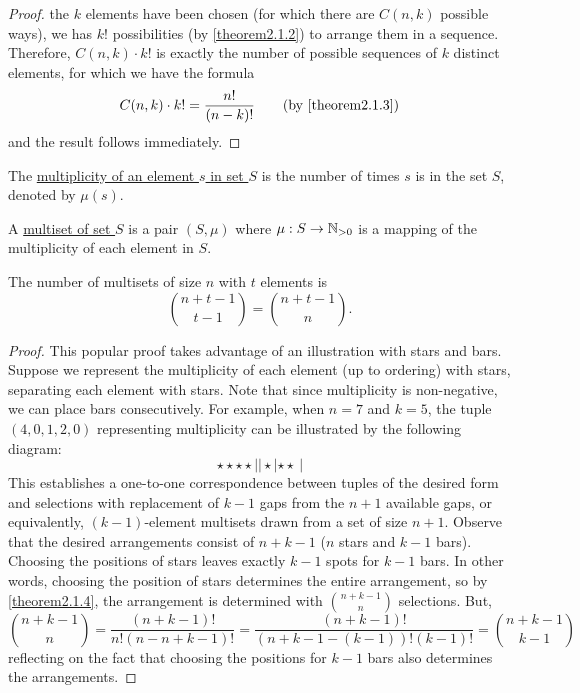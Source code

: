 \documentclass[11pt]{article}
\begin{document}
\begin{titlepage}
\begin{proof}
	the $k$ elements have been chosen (for which there are $C(n,k)$ possible
	ways), we has $k!$ possibilities (by \cref{theorem2.1.2}) to arrange them in
	a sequence. Therefore, $C(n,k) \cdot k!$ is exactly the number of possible
	sequences of $k$ distinct elements, for which we have the formula
	\begin{equation*}
		C(n,k) \cdot k! = \frac{n!}{(n-k)!} \tag{by \cref{theorem2.1.3}}
	\end{equation*}
	and the result follows immediately.
\end{proof}
\begin{definition}
	The \underline{multiplicity of an element $s$ in set $S$} is the number of
	times $s$ is in the set $S$, denoted by $\mu(s)$.
\end{definition}
\begin{definition}
	A \underline{multiset of set $S$} is a pair $(S, \mu)$ where
	$\mu:S\to\mathbb{N}_{>0}$ is a mapping of the multiplicity of each element in $S$.
\end{definition}
\begin{theorem} \label{theorem2.1.5}
	The number of multisets of size $n$ with $t$ elements is 
	\begin{equation*}
		\binom{n+t-1}{t-1} = \binom{n+t-1}{n}.
	\end{equation*}
\end{theorem}
\begin{proof}
	This popular proof takes advantage of an illustration with stars and bars.
	Suppose we represent the multiplicity of each element (up to ordering) with
	stars, separating each element with stars. Note that since multiplicity is
	non-negative, we can place bars consecutively. For example, when $n = 7$ and
	$k = 5$, the tuple $(4,0,1,2,0)$ representing multiplicity can be illustrated
	by the following diagram:
	\begin{equation*}
		\star \star \star \star | | \star | \star \star \> |
	\end{equation*}
	This establishes a one-to-one correspondence between tuples of the desired
	form and selections with replacement of $k-1$ gaps from the $n + 1$
	available gaps, or equivalently, $(k - 1)$-element multisets drawn from a
	set of size $n+1$. Observe that the desired arrangements consist of $n+k-1$
	($n$ stars and $k-1$ bars). Choosing the positions of stars leaves exactly
	$k-1$ spots for $k-1$ bars. In other words, choosing the position of stars
	determines the entire arrangement, so by \cref{theorem2.1.4}, the
	arrangement is determined with $\binom{n+k-1}{n}$ selections. But,
	\begin{equation*}
		\binom{n+k-1}{n} = \frac{(n+k-1)!}{n!(n-n+k-1)!}
		=\frac{(n+k-1)!}{(n+k-1-(k-1))!(k-1)!} = \binom{n+k-1}{k-1}
	\end{equation*}
	reflecting on the fact that choosing the positions for $k-1$ bars also
	determines the arrangements.
\end{proof}


\end{titlepage}
\end{document}

